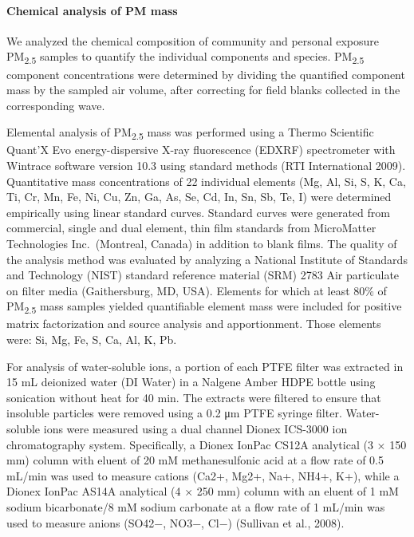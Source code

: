 \documentclass[
  letterpaper,
  DIV=11,
  numbers=noendperiod]{scrartcl}
\let\oldparagraph\paragraph
\renewcommand{\paragraph}[1]{\oldparagraph{#1}\mbox{}}
\begin{document}
\paragraph{Chemical analysis of PM
mass}\label{chemical-analysis-of-pm-mass}

We analyzed the chemical composition of community and personal exposure
PM\textsubscript{2.5} samples to quantify the individual components and
species. PM\textsubscript{2.5} component concentrations were determined
by dividing the quantified component mass by the sampled air volume,
after correcting for field blanks collected in the corresponding wave.

Elemental analysis of PM\textsubscript{2.5} mass was performed using a
Thermo Scientific Quant'X Evo energy-dispersive X-ray fluorescence
(EDXRF) spectrometer with Wintrace software version 10.3 using standard
methods (RTI International 2009). Quantitative mass concentrations of 22
individual elements (Mg, Al, Si, S, K, Ca, Ti, Cr, Mn, Fe, Ni, Cu, Zn,
Ga, As, Se, Cd, In, Sn, Sb, Te, I) were determined empirically using
linear standard curves. Standard curves were generated from commercial,
single and dual element, thin film standards from MicroMatter
Technologies Inc.~(Montreal, Canada) in addition to blank films. The
quality of the analysis method was evaluated by analyzing a National
Institute of Standards and Technology (NIST) standard reference material
(SRM) 2783 Air particulate on filter media (Gaithersburg, MD, USA).
Elements for which at least 80\% of PM\textsubscript{2.5} mass samples
yielded quantifiable element mass were included for positive matrix
factorization and source analysis and apportionment. Those elements
were: Si, Mg, Fe, S, Ca, Al, K, Pb.

For analysis of water-soluble ions, a portion of each PTFE filter was
extracted in 15 mL deionized water (DI Water) in a Nalgene Amber HDPE
bottle using sonication without heat for 40 min. The extracts were
filtered to ensure that insoluble particles were removed using a 0.2 μm
PTFE syringe filter. Water-soluble ions were measured using a dual
channel Dionex ICS-3000 ion chromatography system. Specifically, a
Dionex IonPac CS12A analytical (3 × 150 mm) column with eluent of 20 mM
methanesulfonic acid at a flow rate of 0.5 mL/min was used to measure
cations (Ca2+, Mg2+, Na+, NH4+, K+), while a Dionex IonPac AS14A
analytical (4 × 250 mm) column with an eluent of 1 mM sodium
bicarbonate/8 mM sodium carbonate at a flow rate of 1 mL/min was used to
measure anions (SO42−, NO3−, Cl−) (Sullivan et al., 2008).
\end{document}
